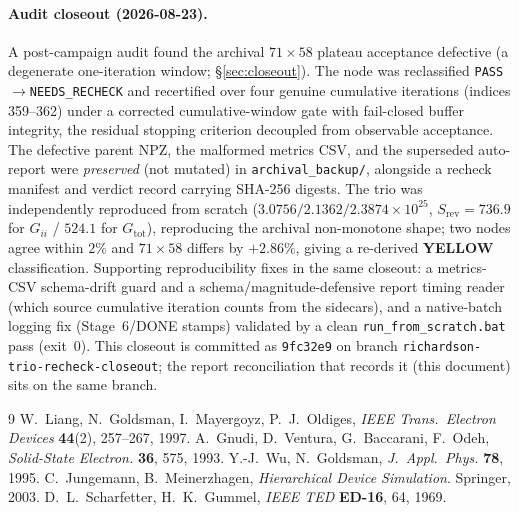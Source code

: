 \documentclass[11pt]{article}
\begin{document}
\paragraph{Audit closeout (2026-08-23).} A post-campaign audit found the archival $71\times58$ plateau
acceptance defective (a degenerate one-iteration window; \S\ref{sec:closeout}). The node was
reclassified \texttt{PASS}$\to$\texttt{NEEDS\_RECHECK} and recertified over four genuine cumulative
iterations (indices 359--362) under a corrected cumulative-window gate with fail-closed buffer
integrity, the residual stopping criterion decoupled from observable acceptance. The defective parent
NPZ, the malformed metrics CSV, and the superseded auto-report were \emph{preserved} (not mutated) in
\texttt{archival\_backup/}, alongside a recheck manifest and verdict record carrying SHA-256 digests.
The trio was independently reproduced from scratch ($3.0756/2.1362/2.3874\times10^{25}$,
$S_{\mathrm{rev}}=736.9$ for $G_{ii}$ / $524.1$ for $G_{\mathrm{tot}}$), reproducing the archival
non-monotone shape; two nodes agree within $2\%$ and $71\times58$ differs by $+2.86\%$, giving a
re-derived \textbf{YELLOW} classification. Supporting reproducibility fixes in the same closeout: a
metrics-CSV schema-drift guard and a schema/magnitude-defensive report timing reader (which source
cumulative iteration counts from the sidecars), and a native-batch logging fix (Stage~6/DONE stamps)
validated by a clean \texttt{run\_from\_scratch.bat} pass (exit~0). This closeout is committed as
\texttt{9fc32e9} on branch \texttt{richardson-trio-recheck-closeout}; the report reconciliation that
records it (this document) sits on the same branch.

\begin{thebibliography}{9}\small
{} W.~Liang, N.~Goldsman, I.~Mayergoyz, P.~J.~Oldiges, \emph{IEEE Trans.\ Electron
Devices} \textbf{44}(2), 257--267, 1997.
 A.~Gnudi, D.~Ventura, G.~Baccarani, F.~Odeh, \emph{Solid-State Electron.}
\textbf{36}, 575, 1993.
 Y.-J.~Wu, N.~Goldsman, \emph{J.\ Appl.\ Phys.} \textbf{78}, 1995.
 C.~Jungemann, B.~Meinerzhagen, \emph{Hierarchical Device Simulation}.
Springer, 2003.
 D.~L.~Scharfetter, H.~K.~Gummel, \emph{IEEE TED} \textbf{ED-16}, 64, 1969.
\end{thebibliography}
\end{document}
